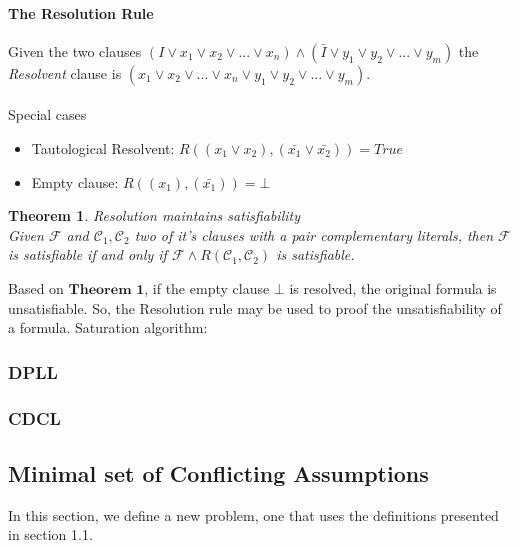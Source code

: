 \documentclass[]{article}
\newtheorem{theorem}{Theorem}
\begin{document}
	\paragraph{The Resolution Rule} Given the two clauses $ (I \lor x_1 \lor x_2 \lor ... \lor x_n)  \land (\bar{I} \lor y_1 \lor y_2 \lor ... \lor y_m)$ the \textit{Resolvent} clause is $ (x_1 \lor x_2 \lor ... \lor x_n \lor y_1 \lor y_2 \lor ... \lor y_m) $. \\ \\
	Special cases
	\begin{itemize}
		\item Tautological Resolvent: $ R((x_1 \lor x_2), (\bar{x_1} \lor \bar{x_2})) = True $
		\item Empty clause: $ R((x_1), (\bar{x_1})) = \bot $
	\end{itemize}


	\begin{theorem}
		Resolution maintains satisfiability\\
		Given $ \mathcal{F} $ and $ \mathcal{C}_1, \mathcal{C}_2 $ two of it's clauses with a pair complementary literals, then $ \mathcal{F} $ is satisfiable if and only if $ \mathcal{F} \land R(\mathcal{C}_1, \mathcal{C}_2) $ is satisfiable.
	\end{theorem}
	Based on $\textbf{Theorem 1}$, if the empty clause $\bot$ is resolved, the original formula is unsatisfiable. So, the Resolution rule may be used to proof the unsatisfiability of a formula.
	Saturation algorithm:
  
\subsubsection{DPLL}
\subsubsection{CDCL}
\subsection{Minimal set of Conflicting Assumptions}
In this section, we define a new problem, one that uses the definitions presented in section 1.1.
\end{document}
